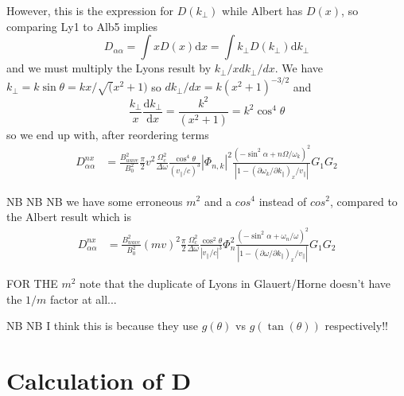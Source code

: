 \documentclass[]{article}
\begin{document}
However, this is the expression for $D(k_\perp)$ while Albert has $D(x)$, so comparing Ly1 to Alb5 implies
\begin{equation}
D_{\alpha\alpha} = \int x D(x) \mathrm{d}x = \int k_\perp D(k_\perp) \mathrm{d} k_\perp
\end{equation}
and we must multiply the Lyons result by $k_\perp/x dk_\perp/dx$. 
We have $k_\perp = k \sin \theta = k x /\sqrt(x^2 +1)$ so $dk_\perp/dx = k (x^2+1)^{-3/2}$ and
\[ \frac{k_\perp}{x}\frac{\mathrm{d} k_\perp}{\mathrm{d} x} = \frac{k^2}{(x^2+1)}  = k^2 \cos^4\theta\]
so we end up with, after reordering terms
\begin{align}\label{LyEnd}
D_{\alpha\alpha}^{nx} &= \frac{B^2_{wave}}{B_0^2} \frac{\pi}{2} v^2 \frac{ \Omega_c^2 }{\Delta \omega}\frac{\cos^4\theta}{(v_\parallel/c)^3} |\Phi_{n,k}|^2 \frac{ (-\sin^2\alpha + n \Omega/\omega_k)^2}{ |1-(\partial \omega_k/\partial k_\parallel)_x/v_\parallel|} G_1 G_2
\end{align}

NB NB NB we have some erroneous $m^2$ and a $cos^4$ instead of $cos^2$, compared to the Albert result which is
\begin{align}
D_{\alpha\alpha}^{nx} &= \frac{B_{wave}^2}{B_0^2}(mv)^2 \frac{\pi}{2}\frac{\Omega_c^2}{\Delta\omega}\frac{\cos^2\theta}{|v_\parallel/c|^3}  \Phi_n^2 \frac{(-\sin^2\alpha + \omega_n/\omega)^2}{|1-(\partial \omega/\partial k_\parallel)_x/v_\parallel|} G_1 G_2 \end{align}

FOR THE $m^2$ note that the duplicate of Lyons in Glauert/Horne doesn't have the $1/m$ factor at all...

NB NB I think this is because they use $g(\theta)$ vs $g(\tan(\theta))$ respectively!!

\section{Calculation of D}
\end{document}
